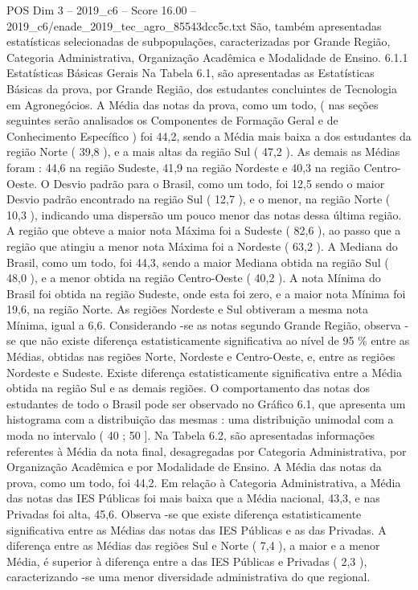 \begin{textsample}{POS Dim 3 – 2019\_c6 – Score 16.00 – 2019\_c6/enade\_2019\_tec\_agro\_85543dcc5c.txt}
São, também apresentadas estatísticas selecionadas de subpopulações, caracterizadas por Grande Região, Categoria Administrativa, Organização Acadêmica e Modalidade de Ensino. 6.1.1 Estatísticas Básicas Gerais Na Tabela 6.1, são apresentadas as Estatísticas Básicas da prova, por Grande Região, dos estudantes concluintes de Tecnologia em Agronegócios.
A Média das notas da prova, como um todo, ( nas seções seguintes serão analisados os Componentes de Formação Geral e de Conhecimento Específico ) foi 44,2, sendo a Média mais baixa a dos estudantes da região Norte ( 39,8 ), e a mais altas da região Sul ( 47,2 ).
As demais as Médias foram : 44,6 na região Sudeste, 41,9 na região Nordeste e 40,3 na região Centro-Oeste.
O Desvio padrão para o Brasil, como um todo, foi 12,5 sendo o maior Desvio padrão encontrado na região Sul ( 12,7 ), e o menor, na região Norte ( 10,3 ), indicando uma dispersão um pouco menor das notas dessa última região.
A região que obteve a maior nota Máxima foi a Sudeste ( 82,6 ), ao passo que a região que atingiu a menor nota Máxima foi a Nordeste ( 63,2 ).
A Mediana do Brasil, como um todo, foi 44,3, sendo a maior Mediana obtida na região Sul ( 48,0 ), e a menor obtida na região Centro-Oeste ( 40,2 ).
A nota Mínima do Brasil foi obtida na região Sudeste, onde esta foi zero, e a maior nota Mínima foi 19,6, na região Norte.
As regiões Nordeste e Sul obtiveram a mesma nota Mínima, igual a 6,6.
Considerando -se as notas segundo Grande Região, observa -se que não existe diferença estatisticamente significativa ao nível de 95 \% entre as Médias, obtidas nas regiões Norte, Nordeste e Centro-Oeste, e, entre as regiões Nordeste e Sudeste.
Existe diferença estatisticamente significativa entre a Média obtida na região Sul e as demais regiões.
O comportamento das notas dos estudantes de todo o Brasil pode ser observado no Gráfico 6.1, que apresenta um histograma com a distribuição das mesmas : uma distribuição unimodal com a moda no intervalo ( 40 ; 50 ].
Na Tabela 6.2, são apresentadas informações referentes à Média da nota final, desagregadas por Categoria Administrativa, por Organização Acadêmica e por Modalidade de Ensino.
A Média das notas da prova, como um todo, foi 44,2.
Em relação à Categoria Administrativa, a Média das notas das IES Públicas foi mais baixa que a Média nacional, 43,3, e nas Privadas foi alta, 45,6.
Observa -se que existe diferença estatisticamente significativa entre as Médias das notas das IES Públicas e as das Privadas.
A diferença entre as Médias das regiões Sul e Norte ( 7,4 ), a maior e a menor Média, é superior à diferença entre a das IES Públicas e Privadas ( 2,3 ), caracterizando -se uma menor diversidade administrativa do que regional.

\end{textsample}
